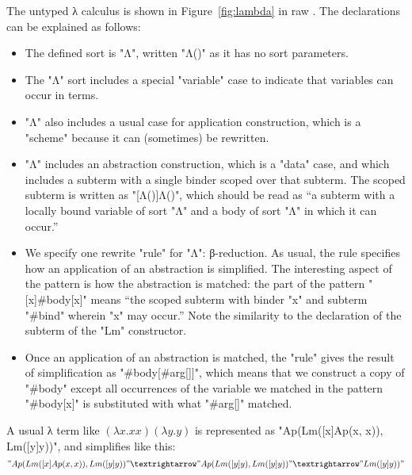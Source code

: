 \documentclass[letterpaper,11pt]{article}
\begin{document}
\begin{example}\label{ex:lambda}
  The untyped λ calculus is shown in Figure~\ref{fig:lambda} in raw \HAX.  The declarations can be
  explained as follows:
  \begin{itemize}

  \item The defined sort is "Λ", written "Λ()" as it has no sort parameters.

  \item The "Λ" sort includes a special "variable" case to indicate that variables can occur in
    terms.

  \item "Λ" also includes a usual case for application construction, which is a "scheme" because it
    can (sometimes) be rewritten.

  \item "Λ" includes an abstraction construction, which is a "data" case, and which includes a
    subterm with a single binder scoped over that subterm. The scoped subterm is written as
    "[Λ()]Λ()", which should be read as ``a subterm with a locally bound variable of sort "Λ" and a
    body of sort "Λ" in which it can occur.''

  \item We specify one rewrite "rule" for "Λ": β-reduction. As usual, the rule specifies how an
    application of an abstraction is simplified. The interesting aspect of the pattern is how the
    abstraction is matched: the part of the pattern "[x]#body[x]" means ``the scoped subterm with
    binder "x" and subterm "#bind" wherein "x" may occur.'' Note the similarity to the declaration
    of the subterm of the "Lm" constructor.

  \item Once an application of an abstraction is matched, the "rule" gives the result of
    simplification as "#body[#arg[]]", which means that we construct a copy of "#body" except all
    occurrences of the variable we matched in the pattern "#body[x]" is substituted with what
    "#arg[]" matched.

  \end{itemize}
  A usual λ term like $(λx.x x)(λy.y)$ is represented as "Ap(Lm([x]Ap(x, x)), Lm([y]y))", and
  simplifies like this:
  \begin{displaymath}
    "Ap(Lm([x]Ap(x, x)), Lm([y]y))" →
    "Ap(Lm([y]y), Lm([y]y))" →
    "Lm([y]y))"
  \end{displaymath}
\end{example}
\end{document}
